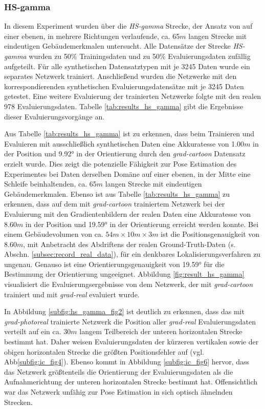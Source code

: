 \subsubsection{HS-gamma}



In diesem Experiment wurden über die \textit{HS-gamma} Strecke, der Ansatz von \citet{acharyaBIMPoseNetIndoorCamera2019} auf einer ebenen, in mehrere Richtungen verlaufende, ca. 65$m$ langen Strecke mit eindeutigen Gebäudemerkmalen untersucht. Alle Datensätze der Strecke \textit{HS-gamma} wurden zu 50\% Trainingsdaten und zu 50\% Evaluierungsdaten zufällig aufgeteilt. Für alle synthetischen Datensatztypen mit je 3245 Daten wurde ein separates Netzwerk trainiert. Anschließend wurden die Netzwerke mit den korrespondierenden synthetischen Evaluierungsdatensätze mit je 3245 Daten getestet. Eine weitere Evaluierung der trainierten Netzwerke folgte mit den realen 978 Evaluierungsdaten. Tabelle \ref{tab:results_hs_gamma} gibt die Ergebnisse dieser Evaluierungsvorgänge an.

Aus Tabelle \ref{tab:results_hs_gamma} ist zu erkennen, dass beim Trainieren und Evaluieren mit ausschließlich synthetischen Daten eine Akkuratesse von 1.00$m$ in der Position und 9.92° in der Orientierung  durch den \textit{grad-cartoon} Datensatz erzielt wurde. Dies zeigt die potenzielle Fähigkeit zur Pose Estimation des Experimentes bei Daten derselben Domäne auf einer ebenen, in der Mitte eine Schleife beinhaltenden, ca. 65$m$ langen Strecke mit eindeutigen Gebäudemerkmalen. Ebenso ist aus Tabelle \ref{tab:results_hs_gamma} zu erkennen, dass auf dem mit \textit{grad-cartoon} trainiertem Netzwerk bei der Evaluierung mit den Gradientenbildern der realen Daten eine Akkuratesse von 8.60$m$ in der Position und 19.59° in der Orientierung erreicht werden konnte. Bei einem Gebäudevolumen von ca. $54m \times 10m \times 3m$ ist die Positionsgenauigkeit von 8.60$m$, mit Anbetracht des Abdriftens der realen Ground-Truth-Daten (s. Abschn. \ref{subsec:record_real_data}), für ein denkbares Lokalisierungsverfahren zu ungenau. Genauso ist eine Orientierungsgenauigkeit von 19.59° für die Bestimmung der Orientierung ungeeignet. Abbildung \ref{fig:result_hs_gamma} visualisiert die Evaluierungsergebnisse von dem Netzwerk, der mit \textit{grad-cartoon} trainiert und mit \textit{grad-real} evaluiert wurde.

In Abbildung \ref{subfig:hs_gamma_fig2} ist deutlich zu erkennen, dass das mit \textit{grad-photoreal} trainierte Netzwerk die Position aller \textit{grad-real} Evaluierungsdaten verteilt auf ein ca. 30$m$ langem Teilbereich der unteren horizontalen Strecke bestimmt hat. Daher weisen Evaluierungsdaten der kürzeren vertikalen sowie der obigen horizontalen Strecke die größten Positionsfehler auf (vgl. Abb\ref{subfig:ic_fig4}). Ebenso kommt in Abbildung \ref{subfig:ic_fig6} hervor, dass das Netzwerk größtenteils die Orientierung der Evaluierungsdaten als die Aufnahmerichtung der unteren horizontalen Strecke bestimmt hat. Offensichtlich war das Netzwerk unfähig zur Pose Estimation in sich optisch ähnelnden Strecken.


